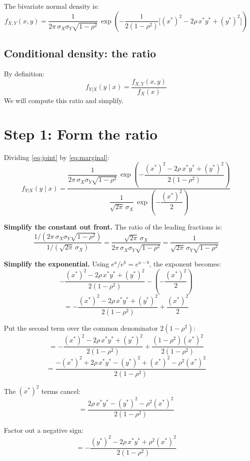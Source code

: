 \documentclass[11pt]{article}
\begin{document}
The bivariate normal density is:
\begin{equation}\label{eq:joint}
f_{X,Y}(x,y)
= \frac{1}{2\pi\,\sigma_X\sigma_Y\sqrt{1-\rho^2}}\,
\exp\!\left(
-\frac{1}{2(1-\rho^2)}
\Big[(x^*)^2 - 2\rho\, x^* y^* + (y^*)^2\Big]
\right)
\end{equation}

\subsection{Conditional density: the ratio}

By definition:
\[
f_{Y|X}(y\mid x) = \frac{f_{X,Y}(x,y)}{f_X(x)}
\]
We will compute this ratio and simplify.

\section{Step 1: Form the ratio}

Dividing \eqref{eq:joint} by \eqref{eq:marginal}:
\[
f_{Y|X}(y\mid x)
= \frac{
\dfrac{1}{2\pi\,\sigma_X\sigma_Y\sqrt{1-\rho^2}}\,
\exp\!\left(
-\dfrac{(x^*)^2 - 2\rho\, x^* y^* + (y^*)^2}{2(1-\rho^2)}
\right)
}{
\dfrac{1}{\sqrt{2\pi}\,\sigma_X}\,
\exp\!\left(-\dfrac{(x^*)^2}{2}\right)
}
\]

\medskip\noindent
\textbf{Simplify the constant out front.}  The ratio of the leading fractions is:
\[
\frac{1/(2\pi\,\sigma_X\sigma_Y\sqrt{1-\rho^2})}{1/(\sqrt{2\pi}\,\sigma_X)}
= \frac{\sqrt{2\pi}\,\sigma_X}{2\pi\,\sigma_X\sigma_Y\sqrt{1-\rho^2}}
= \frac{1}{\sqrt{2\pi}\,\sigma_Y\sqrt{1-\rho^2}}
\]

\medskip\noindent
\textbf{Simplify the exponential.}  Using $e^a / e^b = e^{a-b}$, the exponent becomes:
\[
-\frac{(x^*)^2 - 2\rho\, x^* y^* + (y^*)^2}{2(1-\rho^2)}
- \left(-\frac{(x^*)^2}{2}\right)
\]
\[
= -\frac{(x^*)^2 - 2\rho\, x^* y^* + (y^*)^2}{2(1-\rho^2)}
+ \frac{(x^*)^2}{2}
\]

\medskip\noindent
Put the second term over the common denominator $2(1-\rho^2)$:
\[
= -\frac{(x^*)^2 - 2\rho\, x^* y^* + (y^*)^2}{2(1-\rho^2)}
+ \frac{(1-\rho^2)(x^*)^2}{2(1-\rho^2)}
\]
\[
= \frac{-(x^*)^2 + 2\rho\, x^* y^* - (y^*)^2 + (x^*)^2 - \rho^2(x^*)^2}{2(1-\rho^2)}
\]

\medskip\noindent
The $(x^*)^2$ terms cancel:
\[
= \frac{2\rho\, x^* y^* - (y^*)^2 - \rho^2(x^*)^2}{2(1-\rho^2)}
\]

\medskip\noindent
Factor out a negative sign:
\[
= -\frac{(y^*)^2 - 2\rho\, x^* y^* + \rho^2(x^*)^2}{2(1-\rho^2)}
\]
\end{document}
